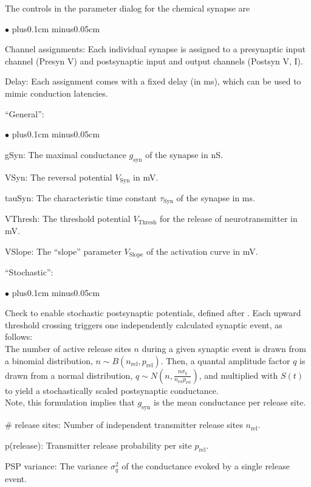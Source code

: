 \documentclass{article}
\newenvironment{myitem}{\begin{list}{$\bullet$}{\setlength{\leftmargin}{1.1em}
\itemsep0.1cm plus0.1cm minus0.05cm
\listparindent0cm
\addtolength{\labelsep}{0.5\labelsep}
\setlength{\labelwidth}{0.8em}
\setlength{\leftmargin}{\labelwidth}
\addtolength{\leftmargin}{\labelsep}
}}{\end{list}}
\begin{document}
  The controls in the parameter dialog for the chemical synapse are
  \begin{myitem}
  \item Channel assignments: Each individual synapse is assigned to a presynaptic input channel
  (Presyn V) and postsynaptic input and output channels (Postsyn V, I).
  \item Delay: Each assignment comes with a fixed delay (in ms), which can be used to mimic
  conduction latencies.
\end{myitem}
``General'':
\begin{myitem}
  \item gSyn: The maximal conductance $g_{\text{syn}}$ of the synapse in nS. 
  \item VSyn: The reversal potential $V_{\text{Syn}}$ in mV. 
\item tauSyn: The characteristic time constant $\tau_{\text{Syn}}$ of
  the synapse in ms.  
\item VThresh: The threshold  potential $V_{\text{Thresh}}$ for the
  release of neurotransmitter in mV.  
\item VSlope: The ``slope'' parameter $V_{\text{Slope}}$ of the
  activation curve in mV.  
  \end{myitem}
``Stochastic'':
\begin{myitem}
	\item Check to enable stochastic postsynaptic potentials, defined after \cite{redman1990quantal}.
	Each upward threshold crossing triggers one independently calculated synaptic event, as follows: \\
	The number of active release sites $n$ during a given synaptic event is drawn from a binomial
	distribution, $n \sim B(n_{\text{rel}}, p_{\text{rel}})$. Then, a quantal amplitude factor $q$
	is drawn from a normal distribution, $q \sim N(n, \frac{n \sigma_q}{n_{\text{rel}} p_{\text{rel}}})$,
	and multiplied with $S(t)$ to yield a stochastically scaled postsynaptic conductance.\\ Note, this
	formulation implies that  $g_{\text{syn}}$ is the mean conductance per release site.
	\item \# release sites: Number of independent transmitter release sites $n_{\text{rel}}$.
	\item p(release): Transmitter release probability per site $p_{\text{rel}}$.
	\item PSP variance: The variance $\sigma_q^2$ of the conductance evoked by a single release event.
\end{myitem}
\end{document}
